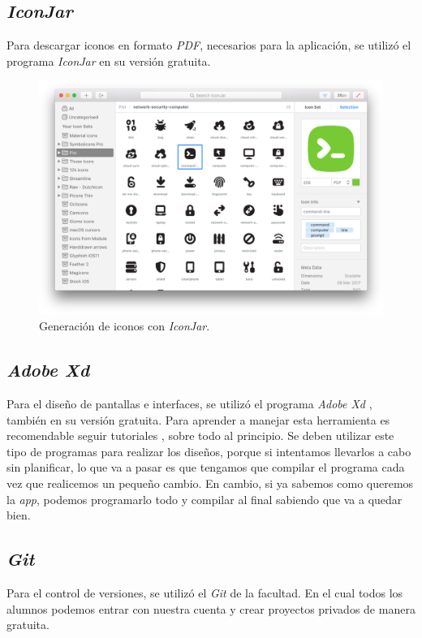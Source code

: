 \subsection{\textit{IconJar}}
Para descargar iconos en formato \textit{PDF}, necesarios para la aplicación, se utilizó el programa \textit{IconJar} \cite{curtis_hard_davey_heuser_iconjar_nodate} en su versión gratuita.
\begin{figure}[tbp]
\begin{center}
\includegraphics[scale=0.37]{figures/iconjar.png}
\caption{Generación de iconos con \textit{IconJar}.}
\end{center}
\end{figure}

\subsection{\textit{Adobe Xd}}
Para el diseño de pantallas e interfaces, se utilizó el programa \textit{Adobe Xd }\cite{noauthor_adobe_nodate}, también en su versión gratuita.
Para aprender a manejar esta herramienta es recomendable seguir tutoriales \cite{forrestknight_how_nodate}, sobre todo al principio.
Se deben utilizar este tipo de programas para realizar los diseños, porque si intentamos llevarlos a cabo sin planificar, lo que va a pasar es que tengamos que compilar el programa cada vez que realicemos un pequeño cambio. En cambio, si ya sabemos como queremos la \textit{app}, podemos programarlo todo y compilar al final sabiendo que va a quedar bien.

\subsection{\textit{Git}}
Para el control de versiones, se utilizó el \textit{Git} \cite{noauthor_git_nodate} de la facultad. En el cual todos los alumnos podemos entrar con nuestra cuenta y crear proyectos privados de manera gratuita.


